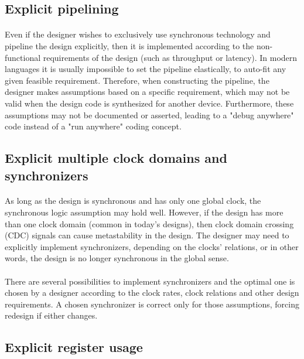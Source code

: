 \subsection*{Explicit pipelining} 
\paragraph{} Even if the designer wishes to exclusively use synchronous technology and pipeline the design explicitly, then it is implemented according to the non-functional requirements of the design (such as throughput or latency). In modern languages it is usually impossible to set the pipeline elastically, to auto-fit any given feasible requirement. Therefore, when constructing the pipeline, the designer makes assumptions based on a specific requirement, which may not be valid when the design code is synthesized for another device. Furthermore, these assumptions may not be documented or asserted, leading to a "debug anywhere" code instead of a "run anywhere" coding concept. 

\subsection*{Explicit multiple clock domains and synchronizers}
\paragraph{}As long as the design is synchronous and has only one global clock, the synchronous logic assumption may hold well. However, if the design has more than one clock domain (common in today's designs), then clock domain crossing (CDC) signals can cause metastability in the design. The designer may need to explicitly implement synchronizers, depending on the clocks' relations, or in other words, the design is no longer synchronous in the global sense. 
\paragraph{}There are several possibilities to implement synchronizers and the optimal one is chosen by a designer according to the clock rates, clock relations and other design requirements. A chosen synchronizer is correct only for those assumptions, forcing redesign if either changes. 

\subsection*{Explicit register usage}
